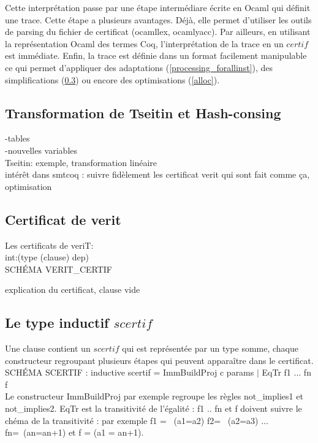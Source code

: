 \documentclass[11pt]{article}
\begin{document}
Cette interprétation passe par une étape intermédiare écrite en Ocaml qui définit une trace. Cette étape a plusieurs avantages. Déjà, elle permet d'utiliser les outils de parsing du fichier de certificat (ocamllex, ocamlyacc). Par ailleurs, en utilisant la représentation Ocaml des termes Coq, l'interprétation de la trace en un $certif$ est immédiate. Enfin, la trace est définie dans un format facilement manipulable ce qui permet d'appliquer des adaptations (\ref{processing_forallinst}), des simplifications (\ref{regroupement}) ou encore des optimisations (\ref{alloc}).




\subsection{Transformation de Tseitin et Hash-consing} \label{tseitin}

-tables \\
-nouvelles variables\\
Tseitin: exemple, transformation linéaire\\
intérêt dans smtcoq : suivre fidèlement les certificat verit qui sont fait comme ça,
optimisation

\subsection{Certificat de verit}

Les certificats de veriT:\\
int:(type (clause) dep) \\

SCHÉMA VERIT\_CERTIF

explication du certificat, clause vide

 \subsection{Le type inductif $scertif$}\label{regroupement}



Une clause contient un $scertif$  qui est représentée par un type somme, chaque constructeur regroupant plusieurs étapes qui peuvent apparaître dans le certificat.\\

SCHÉMA SCERTIF : inductive scertif = ImmBuildProj c params $|$ EqTr f1 ... fn f \\

Le constructeur ImmBuildProj par exemple regroupe les règles not\_implies1 et not\_implies2. EqTr est la transitivité de l'égalité : f1 .. fn et f doivent suivre le chéma de la transitivité : par exemple f1 = ~(a1=a2) f2= ~(a2=a3) ... fn=~(an=a{n+1}) et f = (a1 = a{n+1}).\\
\end{document}
